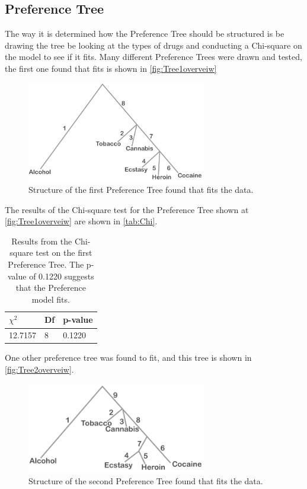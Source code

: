 \subsection*{Preference Tree}
The way it is determined how the Preference Tree should be structured is be drawing the tree be looking at the types of drugs and conducting a Chi-square on the model to see if it fits. Many different Preference Trees were drawn and tested, the first one found that fits is shown in \autoref{fig:Tree1overveiw}
%
\begin{figure}[H]
\centering
\includegraphics[width = 0.70\textwidth]{Figure/Tree1overview}
\caption{Structure of the first Preference Tree found that fits the data.}
\label{fig:Tree1overveiw}
\end{figure}
\noindent
%
The results of the Chi-square test for the Preference Tree shown at \autoref{fig:Tree1overveiw} are shown in \autoref{tab:Chi}. 
%
\begin{table}[H]
\centering
\begin{tabular}{@{}lll@{}}
\toprule
$\chi^{2}$   & Df  & p-value \\ \midrule
12.7157      & 8   & 0.1220  \\ \bottomrule
\end{tabular}
\caption{Results from the Chi-square test on the first Preference Tree. The p-value of 0.1220 suggests that the Preference model fits.}
\label{tab:Chi1}
\end{table} 
\noindent
%
One other preference tree was found to fit, and this tree is shown in \autoref{fig:Tree2overveiw}. 
%
\begin{figure}[H]
\centering
\includegraphics[width = 0.70\textwidth]{Figure/Tree2overview}
\caption{Structure of the second Preference Tree found that fits the data.}
\label{fig:Tree2overveiw}
\end{figure}

